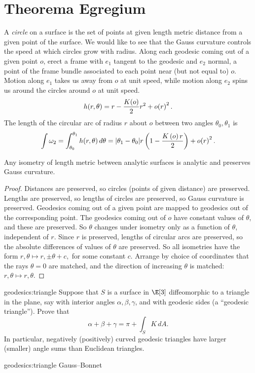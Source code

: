 \section{Theorema Egregium}
A \emph{circle} on a surface is the set of points at given length metric distance from a given point of the surface.
We would like to see that the Gauss curvature controls the speed at which circles grow with radius.
Along each geodesic coming out of a given point \(o\), erect a frame with \(e_1\) tangent to the geodesic and \(e_2\) normal, a point of the frame bundle associated to each point near (but not equal to) \(o\).
Motion along \(e_1\) takes us away from \(o\) at unit speed, while motion along \(e_2\) spins us around the circles around \(o\) at unit speed.
\[
h(r,\theta)=r-\frac{K\!\left(o\right)}{2} r^2 + o\!\left(r\right)^2.
\]
The length of the circular arc of radius \(r\) about \(o\) between two angles \(\theta_0,\theta_1\) is
\[
\int \omega_2 = \int_{\theta_0}^{\theta_1} h(r,\theta) \, d\theta 
=
|\theta_1-\theta_0|r \left(1 - \frac{K\left(o\right)r}{2}\right) + o\!\left(r\right)^2.
\]
\begin{theorem}
Any isometry of length metric between analytic surfaces is analytic and preserves Gauss curvature.
\end{theorem}
\begin{proof}
Distances are preserved, so circles (points of given distance) are preserved. Lengths are preserved, so lengths of circles are preserved, so Gauss curvature is preserved.
Geodesics coming out of a given point are mapped to geodesics out of the corresponding point.
The geodesics coming out of \(o\) have constant values of \(\theta\), and these are preserved.
So \(\theta\) changes under isometry only as a function of \(\theta\), independent of \(r\).
Since \(r\) is preserved, lengths of circular arcs are preserved, so the absolute differences of values of \(\theta\) are preserved.
So all isometries have the form
\(
r,\theta\mapsto r,\pm\theta+c,
\)
for some constant \(c\).
Arrange by choice of coordinates that the rays \(\theta=0\) are matched, and the direction of increasing \(\theta\) is matched:
\(
r,\theta\mapsto r,\theta.
\)
\end{proof}
\begin{problem}{geodesics:triangle}
Suppose that \(S\) is a surface in \(\E[3]\) diffeomorphic to a triangle in the plane, say with interior angles \(\alpha, \beta, \gamma\), and with geodesic sides (a ``geodesic triangle'').
Prove that
\[
\alpha+\beta+\gamma= \pi + \int_S K \, dA.
\]
In particular, negatively (positively) curved geodesic triangles have larger (smaller) angle sums than Euclidean triangles.  
\end{problem}
\begin{answer}{geodesics:triangle}
Gauss--Bonnet
\end{answer}

